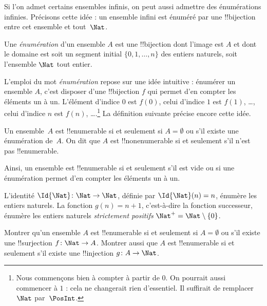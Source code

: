\documentclass[11pt,a4paper,openany]{memoir}
\begin{document}
Si l'on admet certains ensembles infinis, on peut aussi admettre
des énumérations infinies. Précisons cette idée : un ensemble infini
est énuméré par une !!{bijection} entre cet ensemble et tout~$\Nat$.

\begin{defn}
Une \emph{énumération} d'un ensemble $A$ est une !!{bijection} dont
l'image est $A$ et dont le domaine est soit un segment initial
$\{0, 1, \ldots, n\}$ des entiers naturels, soit l'ensemble
$\Nat$ tout entier.
\end{defn}

\begin{explain}
L'emploi du mot \emph{énumération} repose sur une idée intuitive :
énumérer un ensemble $A$, c'est disposer d'une !!{bijection} $f$
qui permet d'en compter les éléments un à un. L'élément d'indice
$0$ est $f(0)$, celui d'indice $1$ est $f(1)$, \ldots, celui
d'indice $n$ est $f(n)$, \ldots.\footnote{Nous commençons bien
à compter à partir de $0$. On pourrait aussi commencer à $1$ :
cela ne changerait rien d'essentiel. Il suffirait de remplacer
$\Nat$ par~$\PosInt$.} La définition suivante précise encore
cette idée.
\end{explain}

\begin{defn}
  Un ensemble~$A$ est !!{enumerable} si et seulement si
  $A = \emptyset$ ou s'il existe une énumération de~$A$.
  On dit que $A$ est !!{nonenumerable} si et seulement s'il
  n'est pas !!{enumerable}.
\end{defn}

\begin{explain}
Ainsi, un ensemble est !!{enumerable} si et seulement s'il est
vide ou si une énumération permet d'en compter les éléments un à un.
\end{explain}

\begin{ex}
L'identité $\Id{\Nat} \colon \Nat \to \Nat$, définie par
$\Id{\Nat}(n) = n$, énumère les entiers naturels. La fonction
$g(n) = n + 1$, c'est-à-dire la fonction successeur, énumère les
entiers naturels \emph{strictement positifs}
$\Nat^+ = \Nat \setminus \{0\}$.
\end{ex}

\begin{prob}
Montrer qu'un ensemble $A$ est !!{enumerable} si et seulement si
$A = \emptyset$ ou s'il existe une !!{surjection}
$f\colon \Nat \to A$. Montrer aussi que $A$ est !!{enumerable}
si et seulement s'il existe une !!{injection} $g\colon A \to \Nat$.
\end{prob}
\end{document}
